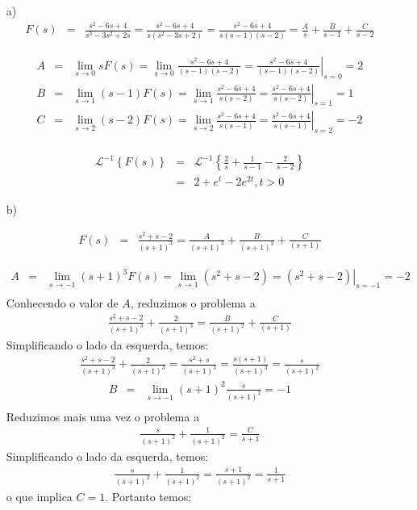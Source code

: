 \begin{Answer}
\begin{itemize}
 \item [a)]
 \begin{eqnarray*}
F(s)&=&\frac{s^2-6s+4}{s^3-3s^2+2s}=\frac{s^2-6s+4}{s(s^2-3s+2)}=\frac{s^2-6s+4}{s(s-1)(s-2)}=\frac{A}{s}+\frac{B}{s-1}+\frac{C}{s-2}
\end{eqnarray*}

\begin{eqnarray*}
A&=&\lim_{s\to 0}sF(s)=\lim_{s\to 0}\frac{s^2-6s+4}{(s-1)(s-2)}=\left.\frac{s^2-6s+4}{(s-1)(s-2)}\right|_{s=0}=2\\
B&=&\lim_{s\to 1}(s-1)F(s)=\lim_{s\to 1}\frac{s^2-6s+4}{s(s-2)}=\left.\frac{s^2-6s+4}{s(s-2)}\right|_{s=1}=1\\
C&=&\lim_{s\to 2}(s-2)F(s)=\lim_{s\to 2}\frac{s^2-6s+4}{s(s-1)}=\left.\frac{s^2-6s+4}{s(s-1)}\right|_{s=2}=-2\\
\end{eqnarray*}

\begin{eqnarray*}
\mathcal{L}^{-1}\left\{F(s)\right\}&=&\mathcal{L}^{-1}\left\{\frac{2}{s}+\frac{1}{s-1}-\frac{2}{s-2}\right\}\\
&=&2+e^{t}-2e^{2t},t>0
\end{eqnarray*}

 \item [b)]

\begin{eqnarray*}
F(s)&=&\frac{s^2+s-2}{(s+1)^3}=\frac{A}{(s+1)^3}+\frac{B}{(s+1)^2}+\frac{C}{(s+1)}
\end{eqnarray*}

\begin{eqnarray*}
A&=&\lim_{s\to -1}(s+1)^3F(s)=\lim_{s\to 1}(s^2+s-2)=\left.(s^2+s-2)\right|_{s=-1}=-2\\
\end{eqnarray*}
Conhecendo o valor de $A$, reduzimos o problema a
\begin{eqnarray*}
\frac{s^2+s-2}{(s+1)^3}+\frac{2}{(s+1)^3}=\frac{B}{(s+1)^2}+\frac{C}{(s+1)}
\end{eqnarray*}
Simplificando o lado da esquerda, temos:
\begin{eqnarray*}
\frac{s^2+s-2}{(s+1)^3}+\frac{2}{(s+1)^3}=\frac{s^2+s}{(s+1)^3}=\frac{s(s+1)}{(s+1)^3}=\frac{s}{(s+1)^2}
\end{eqnarray*}
\begin{eqnarray*}
B&=&\lim_{s\to -1}(s+1)^2\frac{s}{(s+1)^2}=-1\\
\end{eqnarray*}
Reduzimos mais uma vez o problema a
\begin{eqnarray*}
\frac{s}{(s+1)^2}+\frac{1}{(s+1)^2}=\frac{C}{s+1}
\end{eqnarray*}
Simplificando o lado da esquerda, temos:
\begin{eqnarray*}
\frac{s}{(s+1)^2}+\frac{1}{(s+1)^2}=\frac{s+1}{(s+1)^2}=\frac{1}{s+1}
\end{eqnarray*}
o que implica $C=1$. Portanto temos:


\end{itemize}
\end{Answer}
